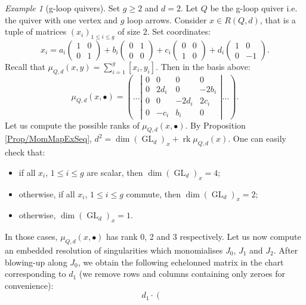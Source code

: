 \documentclass[11pt,english]{article}
\numberwithin{equation}{section}
\numberwithin{figure}{section}
\theoremstyle{definition}
\theoremstyle{plain}
\theoremstyle{remark}
\newtheorem{exmp}[df]{Example}
\DeclareMathOperator{\GL}{GL}
\DeclareMathOperator{\rk}{rk}
\begin{document}
\begin{exmp}[g-loop quivers]

Set $g\geq2$ and $d=2$. Let $Q$ be the g-loop quiver i.e. the quiver
with one vertex and $g$ loop arrows. Consider $x\in R(Q,d)$, that
is a tuple of matrices $(x_{i})_{1\leq i\leq g}$ of size $2$. Set
coordinates:\[
x_i=
a_i
\left(
\begin{array}{cc}
1 & 0 \\
0 & 1
\end{array}
\right)
+
b_i
\left(
\begin{array}{cc}
0 & 1 \\
0 & 0
\end{array}
\right)
+
c_i
\left(
\begin{array}{cc}
0 & 0 \\
1 & 0
\end{array}
\right)
+
d_i
\left(
\begin{array}{cc}
1 & 0 \\
0 & -1
\end{array}
\right)
.
\]Recall that $\mu_{Q,d}(x,y)=\sum_{i=1}^{g}[x_{i},y_{i}]$. Then in
the basis above:\[
\mu_{Q,d}(x,\bullet)
=
\left(
\ldots
\left\vert
\begin{array}{cccc}
0 & 0 & 0 & 0 \\
0 & 2d_i & 0 & -2b_i \\
0 & 0 & -2d_i & 2c_i \\
0 & -c_i & b_i & 0
\end{array}
\right\vert
\ldots
\right)
.
\]Let us compute the possible ranks of $\mu_{Q,d}(x,\bullet)$. By Proposition
\ref{Prop/MomMapExSeq}, $d^{2}=\dim(\GL_{d})_{x}+\rk\mu_{Q,d}(x)$.
One can easily check that:
\begin{itemize}
\item if all $x_{i}$, $1\leq i\leq g$ are scalar, then $\dim(\GL_{d})_{x}=4$;
\item otherwise, if all $x_{i}$, $1\leq i\leq g$ commute, then $\dim(\GL_{d})_{x}=2$;
\item otherwise, $\dim(\GL_{d})_{x}=1$.
\end{itemize}
In those cases, $\mu_{Q,d}(x,\bullet)$ has rank 0, 2 and 3 respectively.
Let us now compute an embedded resolution of singularities which monomialises
$J_{0}$, $J_{1}$ and $J_{2}$. After blowing-up along $J_{0}$,
we obtain the following echelonned matrix in the chart corresponding
to $d_{1}$ (we remove rows and columns containing only zeroes for
convenience):\[
d_1\cdot
\left(
\left.
\begin{array}{ccc}

\end{array}\]
\end{exmp}
\end{document}
